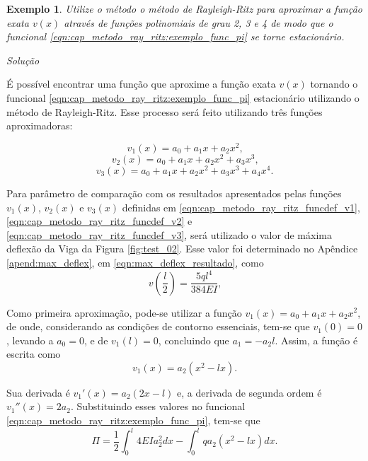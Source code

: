 \documentclass[
	12pt,				%
	openright,			%
    twoside,			%
	a4paper,			%
	chapter=TITLE,		%
	english,			%
	french,				%
	spanish,			%
	brazil				%
	]{abntex2}
\makeatletter
\newtheorem{exemplo}{Exemplo}
\renewenvironment{proof}[1][\proofname]{
	\par\pushQED{\qed}%
	\normalfont \topsep6\p@\@plus6\p@\relax
	\trivlist
	\item\relax
		{\itshape
			#1\@addpunct{.}}\hspace\labelsep\ignorespaces
}{%
	\popQED\endtrivlist\@endpefalse
}
\newenvironment{solution}{
	\begin{proof}[Solução]
}{%
	\end{proof}
}
\numberwithin{lema}{chapter}
\numberwithin{teorema}{chapter}
\numberwithin{definicao}{chapter}
\numberwithin{exemplo}{chapter}
\numberwithin{figure}{chapter}
\newcommand{\noEquationSpacing}[1]{
	{
		\setlength{\belowdisplayskip}{0pt} \setlength{\belowdisplayshortskip}{0pt}
		\setlength{\abovedisplayskip}{0pt} \setlength{\abovedisplayshortskip}{0pt}
		#1
	}
}
\makeatother
\begin{document}
\begin{exemplo}
	Utilize o método o método de Rayleigh-Ritz para aproximar a função exata $v(x)$ através de funções polinomiais de grau 2, 3 e 4 de modo que o funcional \eqref{eqn:cap_metodo_ray_ritz:exemplo_func_pi} se torne estacionário.
\end{exemplo}

\begin{solution}
	É possível encontrar uma função que aproxime a função exata $v(x)$ tornando o funcional \eqref{eqn:cap_metodo_ray_ritz:exemplo_func_pi} estacionário utilizando o método de Rayleigh-Ritz. Esse processo será feito utilizando três funções aproximadoras:
	\noEquationSpacing
	{
		\begin{equation}
			\label{eqn:cap_metodo_ray_ritz_funcdef_v1}
			v_1 (x) = a_0 + a_1 x + a_2 x^2
			\text{,}
		\end{equation}
		\begin{equation}
			\label{eqn:cap_metodo_ray_ritz_funcdef_v2}
			v_2 (x) = a_0 + a_1 x + a_2 x^2 + a_3 x^3
			\text{,}
		\end{equation}
		\begin{equation}
			\label{eqn:cap_metodo_ray_ritz_funcdef_v3}
			v_3 (x) = a_0 + a_1 x + a_2 x^2 + a_3 x^3 + a_4 x^4
			\text{.}
		\end{equation}
	}
	
	Para parâmetro de comparação com os resultados apresentados pelas funções $v_1(x)$, $v_2(x)$ e $v_3(x)$ definidas em \eqref{eqn:cap_metodo_ray_ritz_funcdef_v1}, \eqref{eqn:cap_metodo_ray_ritz_funcdef_v2} e \eqref{eqn:cap_metodo_ray_ritz_funcdef_v3}, será utilizado o valor de máxima deflexão da Viga da Figura \ref{fig:test_02}. Esse valor foi determinado no Apêndice \ref{apend:max_deflex}, em \eqref{eqn:max_deflex_resultado}, como
	\begin{equation}
		\label{eqn:cap_metodo_ray_ritz:ex1_max_deflex_exato}
		v\left (\frac{l}{2} \right)=\frac{5ql^4}{384EI}
		\text{,}
	\end{equation}
	
	Como primeira aproximação, pode-se utilizar a função $v_1(x)=a_0+a_1x+a_2x^2$, de onde, considerando as condições de contorno essenciais, tem-se que $v_1(0)=0$, levando a $a_0=0$, e de $v_1(l)=0$, concluindo que $a_1=-a_2l$. Assim, a função é escrita como
	$$
		v_1(x)=a_2(x^2-lx)
		\text{.}
	$$
	
	Sua derivada é $v_1'(x)=a_2(2x-l)$ e, a derivada de segunda ordem é $v_1''(x)=2a_2$. Substituindo esses valores no funcional \eqref{eqn:cap_metodo_ray_ritz:exemplo_func_pi}, tem-se que
	$$
		\Pi =
		\frac{1}{2}
		\int_0^l 4 EI a_2 ^2 dx
		-
		\int_0^l q a_2 (x^2-lx) dx
		\text{.}
	$$
	

\end{solution}
\end{document}
